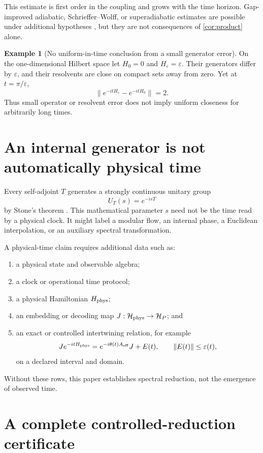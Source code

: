 \documentclass[11pt]{article}
\theoremstyle{definition}
\newtheorem{example}[theorem]{Example}
\theoremstyle{remark}
\newcommand{\cH}{\mathcal H}
\newcommand{\1}{\mathbf 1}
\begin{document}
This estimate is first order in the coupling and grows with the time
horizon.  Gap-improved adiabatic, Schrieffer--Wolff, or superadiabatic
estimates are possible under additional hypotheses
\cite{BravyiDiVincenzoLoss2011}, but they are not consequences of
\cref{cor:product} alone.

\begin{example}[No uniform-in-time conclusion from a small generator error]
On the one-dimensional Hilbert space let \(H_0=0\) and
\(H_\varepsilon=\varepsilon\).  Their generators differ by
\(\varepsilon\), and their resolvents are close on compact sets away from
zero.  Yet at \(t=\pi/\varepsilon\),
\[
\|e^{-itH_\varepsilon}-e^{-itH_0}\|=2.
\]
Thus small operator or resolvent error does not imply uniform closeness for
arbitrarily long times.
\end{example}

\section{An internal generator is not automatically physical time}
\label{sec:time}

Every self-adjoint \(T\) generates a strongly continuous unitary group
\[
  U_T(s)=e^{-isT}
\]
by Stone's theorem \cite{ReedSimonI1980}.  This mathematical parameter
\(s\) need not be the time read by a physical clock.  It might label a
modular flow, an internal phase, a Euclidean interpolation, or an auxiliary
spectral transformation.

A physical-time claim requires additional data such as:
\begin{enumerate}[leftmargin=2em]
\item a physical state and observable algebra;
\item a clock or operational time protocol;
\item a physical Hamiltonian \(H_{\rm phys}\);
\item an embedding or decoding map
      \(J:\cH_{\rm phys}\to\cH_P\); and
\item an exact or controlled intertwining relation, for example
\[
  J e^{-itH_{\rm phys}}
  =
  e^{-i\theta(t)A_{\rm eff}}J
  +E(t),
  \qquad
  \|E(t)\|\leq\varepsilon(t),
\]
on a declared interval and domain.
\end{enumerate}
Without these rows, this paper establishes spectral reduction, not the
emergence of observed time.

\section{A complete controlled-reduction certificate}
\label{sec:certificate}
\end{document}
